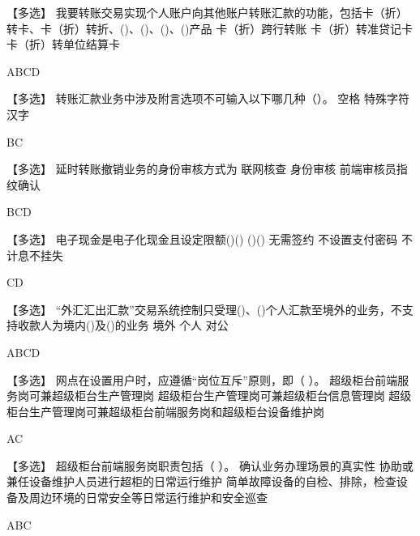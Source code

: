 \documentclass[kindlepaper]{BHCexam4kindle}
\begin{document}
\begin{questions}
\qs 【多选】 我要转账交易实现个人账户向其他账户转账汇款的功能，包括卡（折）转卡、卡（折）转折、()、()、()、()产品 \xx
{} {  卡（折）跨行转账 } { 卡（折）转准贷记卡 } { 卡（折）转单位结算卡 }
\begin{solution} ABCD \end{solution}
\qs 【多选】 转账汇款业务中涉及附言选项不可输入以下哪几种（）。 \xx
{} {  空格 } { 特殊字符 } { 汉字 }
\begin{solution} BC  \end{solution}
\qs 【多选】 延时转账撤销业务的身份审核方式为 \xx
{} {  联网核查 } { 身份审核 } { 前端审核员指纹确认 }
\begin{solution} BCD \end{solution}
\qs 【多选】 电子现金是电子化现金且设定限额()() ()() \xx
{} {  无需签约 } { 不设置支付密码 } { 不计息不挂失 }
\begin{solution} CD \end{solution}
\qs 【多选】 “外汇汇出汇款”交易系统控制只受理()、()个人汇款至境外的业务，不支持收款人为境内()及()的业务 \xx
{} {  境外 } { 个人 } { 对公 }
\begin{solution} ABCD \end{solution}
\qs 【多选】 网点在设置用户时，应遵循“岗位互斥”原则，即（  ）。 \xx
{} {  超级柜台前端服务岗可兼超级柜台生产管理岗 } { 超级柜台生产管理岗可兼超级柜台信息管理岗 } { 超级柜台生产管理岗可兼超级柜台前端服务岗和超级柜台设备维护岗 }
\begin{solution} AC \end{solution}
\qs 【多选】 超级柜台前端服务岗职责包括（  ）。 \xx
{} {  确认业务办理场景的真实性 } { 协助或兼任设备维护人员进行超柜的日常运行维护 } { 简单故障设备的自检、排除，检查设备及周边环境的日常安全等日常运行维护和安全巡查 }
\begin{solution} ABC \end{solution}

\end{questions}
\end{document}
